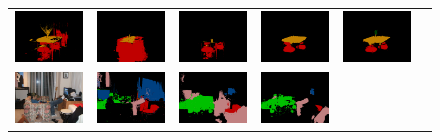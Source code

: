\begin{figure}[!htbp]
{\begin{tabular}{c c c c c c}
    \includegraphics[height=0.11\linewidth]{fig/val_crf_vis/adaweak/2007_000830.png} &
    \includegraphics[height=0.11\linewidth]{fig/val_crf_vis/bbox/2007_000830.png} &
    \includegraphics[height=0.11\linewidth]{fig/val_crf_vis/bbox_crf/2007_000830.png} &
    \includegraphics[height=0.11\linewidth]{fig/val_crf_vis/strongweak/2007_000830.png} &
    \includegraphics[height=0.11\linewidth]{fig/val_crf_vis/cocomix/2007_000830.png} \\
    \includegraphics[height=0.11\linewidth]{fig/val_crf_vis/img/2007_001175.jpg} &
    \includegraphics[height=0.11\linewidth]{fig/val_crf_vis/adaweak/2007_001175.png} &
    \includegraphics[height=0.11\linewidth]{fig/val_crf_vis/bbox/2007_001175.png} &
    \includegraphics[height=0.11\linewidth]{fig/val_crf_vis/bbox_crf/2007_001175.png} &

\end{tabular}}
\end{figure}
